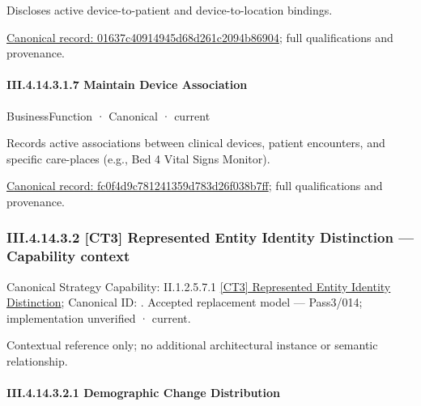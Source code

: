 Discloses active device-to-patient and device-to-location bindings.


{\footnotesize \href{../../../../../../../../continuum/business/business-service/01637c40914945d68d261c2094b86904.md}{Canonical record: 01637c40914945d68d261c2094b86904}; full qualifications and provenance.}\par
\paragraph*{III.4.14.3.1.7 Maintain Device Association}
\label{navigation:III.4.14.3.1.7}

\label{element:fc0f4d9c781241359d783d26f038b7ff}
{\small BusinessFunction · Canonical · current}\par

Records active associations between clinical devices, patient encounters, and specific care-places (e.g., Bed 4 Vital Signs Monitor).


{\footnotesize \href{../../../../../../../../continuum/business/business-function/fc0f4d9c781241359d783d26f038b7ff.md}{Canonical record: fc0f4d9c781241359d783d26f038b7ff}; full qualifications and provenance.}\par
\subsubsection*{III.4.14.3.2 [CT3] Represented Entity Identity Distinction — Capability context}
\label{navigation:III.4.14.3.2}

{\small Canonical Strategy Capability: II.1.2.5.7.1 \hyperref[element:d403533b88f243d0aa555a3a7566b5d1]{[CT3] Represented Entity Identity Distinction}; Canonical ID: \texttt{}. Accepted replacement model — Pass3/014; implementation unverified · current.}\par
Contextual reference only; no additional architectural instance or semantic relationship.\par
\paragraph*{III.4.14.3.2.1 Demographic Change Distribution}
\label{navigation:III.4.14.3.2.1}

